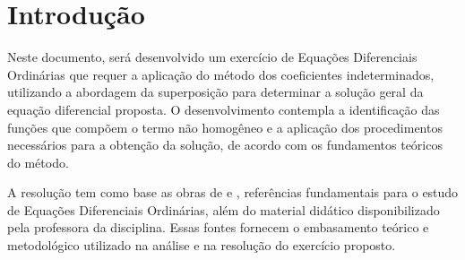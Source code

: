 \section{Introdução}

Neste documento, será desenvolvido um exercício de Equações Diferenciais
Ordinárias que requer a aplicação do método dos coeficientes indeterminados,
utilizando a abordagem da superposição para determinar a solução geral da
equação diferencial proposta. O desenvolvimento contempla a identificação das
funções que compõem o termo não homogêneo e a aplicação dos procedimentos
necessários para a obtenção da solução, de acordo com os fundamentos teóricos
do método.

A resolução tem como base as obras de \citeauthor{zill2001equacoes}
\cite{zill2001equacoes} e \citeauthor{boyce2015equacoes}
\cite{boyce2015equacoes}, referências fundamentais para o estudo de Equações
Diferenciais Ordinárias, além do material didático disponibilizado pela
professora da disciplina. Essas fontes fornecem o embasamento teórico e
metodológico utilizado na análise e na resolução do exercício proposto.

